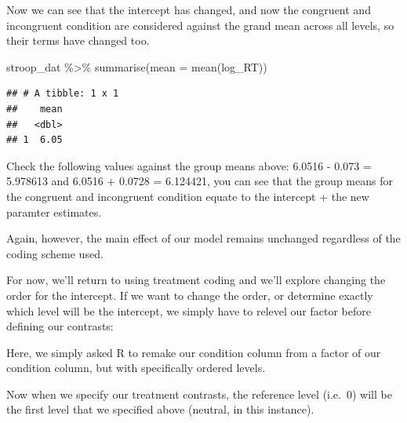 \documentclass[
]{book}
\newenvironment{Shaded}{\begin{snugshade}}{\end{snugshade}}
\newcommand{\AttributeTok}[1]{\textcolor[rgb]{0.77,0.63,0.00}{#1}}
\newcommand{\FunctionTok}[1]{\textcolor[rgb]{0.00,0.00,0.00}{#1}}
\newcommand{\NormalTok}[1]{#1}
\newcommand{\OtherTok}[1]{\textcolor[rgb]{0.56,0.35,0.01}{#1}}
\newcommand{\SpecialCharTok}[1]{\textcolor[rgb]{0.00,0.00,0.00}{#1}}
\newcommand{\StringTok}[1]{\textcolor[rgb]{0.31,0.60,0.02}{#1}}
\begin{document}
Now we can see that the intercept has changed, and now the congruent and incongruent condition are considered against the grand mean across all levels, so their terms have changed too.

\begin{Shaded}
\begin{Highlighting}[]
\NormalTok{stroop\_dat }\SpecialCharTok{\%\textgreater{}\%} \FunctionTok{summarise}\NormalTok{(}\AttributeTok{mean =} \FunctionTok{mean}\NormalTok{(log\_RT))}
\end{Highlighting}
\end{Shaded}

\begin{verbatim}
## # A tibble: 1 x 1
##    mean
##   <dbl>
## 1  6.05
\end{verbatim}

Check the following values against the group means above: 6.0516 - 0.073 = 5.978613 and 6.0516 + 0.0728 = 6.124421, you can see that the group means for the congruent and incongruent condition equate to the intercept + the new paramter estimates.

Again, however, the main effect of our model remains unchanged regardless of the coding scheme used.

For now, we'll return to using treatment coding and we'll explore changing the order for the intercept. If we want to change the order, or determine exactly which level will be the intercept, we simply have to relevel our factor before defining our contrasts:

\begin{Shaded}
\end{Shaded}

Here, we simply asked R to remake our condition column from a factor of our condition column, but with specifically ordered levels.

Now when we specify our treatment contrasts, the reference level (i.e.~0) will be the first level that we specified above (neutral, in this instance).
\end{document}
